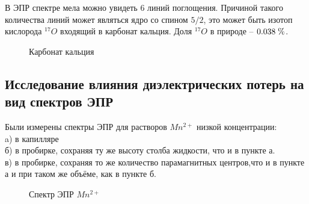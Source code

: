 \documentclass[a4paper,12pt]{article}
\theoremstyle{plain} %
\theoremstyle{definition} %
\theoremstyle{remark} %
\begin{document}
\newpage

В ЭПР спектре мела можно увидеть 6 линий поглощения. Причиной такого количества линий 
может являться ядро со спином $5/2$, это может быть изотоп кислорода $^{17}O$ входящий в карбонат 
кальция. Доля $^{17}O$ в природе -- $0.038 \hspace{1 mm}\%$.

\begin{figure}[h!]
	\caption{Карбонат кальция}
	\label{fig:image}
\end{figure}

\subsection{Исследование влияния диэлектрических потерь на вид спектров ЭПР}

Были измерены спектры ЭПР для растворов $Mn^{2+}$ низкой концентрации:
\\
a) в капилляре
\\б) в пробирке, сохраняя ту же высоту столба жидкости, что и в пункте а.
\\в) в пробирке, сохраняя то же количество парамагнитных центров,что и в пункте а и при таком же объёме, как в пункте б.

\begin{figure}[h!]
	\caption{Спектр ЭПР $Mn^{2+}$}
	\label{fig:image}
\end{figure}
\end{document}
